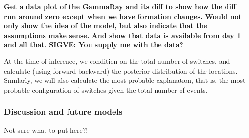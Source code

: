 {\bf Get a data plot of the GammaRay and its diff to show how the diff run around zero except when we have formation changes. Would not only show the idea of the model, but also indicate that the assumptions make sense. And show that data is available from day 1 and all that. SIGVE: You supply me with the data?}

At the time of inference, we condition on the total number of switches, and calculate (using forward-backward) the posterior distribution of the locations. Similarly, we will also calculate the most probable explanation, that is, the most probable configuration of switches given the total number of events.


\subsubsection{Discussion and future models}


Not sure what to put here?!


